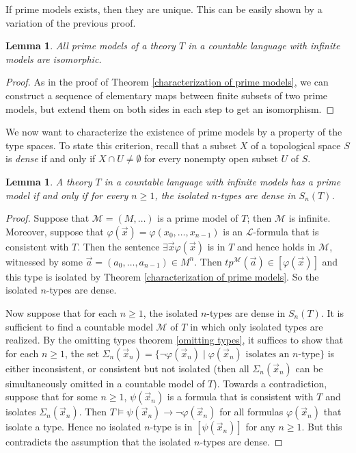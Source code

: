 \documentclass[10pt]{amsart}
\renewcommand{\L}{\mathcal{L}}
\newcommand{\MM}{\mathcal{M}}
\newtheorem{lemma}[theorem]{Lemma}
\theoremstyle{definition}
\theoremstyle{remark}
\begin{document}
If prime models exists, then they are unique. This can be easily shown by a variation of the previous proof.  

\begin{lemma} 
All prime models of a theory $T$ in a countable language with infinite models are isomorphic. 
\end{lemma} 
\begin{proof} 
As in the proof of Theorem \ref{characterization of prime models}, we can construct a sequence of elementary maps between finite subsets of two prime models, but extend them on both sides in each step to get an isomorphism. 
\end{proof} 

We now want to characterize the existence of prime models by a property of the type spaces. To state this criterion, recall that a subset $X$ of a topological space $S$ is \emph{dense} if and only if $X\cap U\neq \emptyset$ for every nonempty open subset $U$ of $S$. 

\begin{lemma} \label{characterization of theories with prime models}
A theory $T$ in a countable language with infinite models has a prime model if and only if for every $n\geq1$, the isolated $n$-types are dense in $S_n(T)$. 
\end{lemma} 
\begin{proof} 
Suppose that $\MM=(M,\dots)$ is a prime model of $T$; then $\MM$ is infinite. Moreover, suppose that $\varphi(\vec{x})=\varphi(x_0,\dots,x_{n-1})$ is an $\L$-formula that is consistent with $T$. Then the sentence $\exists \vec{x}\varphi(\vec{x})$ is in $T$ and hence holds in $\MM$, witnessed by some $\vec{a}=(a_0,\dots,a_{n-1})\in M^n$. Then $tp^\MM(\vec{a})\in [\varphi(\vec{x})]$ and this type is isolated by Theorem \ref{characterization of prime models}. So the isolated $n$-types are dense. 

Now suppose that for each $n\geq1$, the isolated $n$-types are dense in $S_n(T)$. It is sufficient to find a countable model $\MM$ of $T$ in which only isolated types are realized. By the omitting types theorem \ref{omitting types}, it suffices to show that for each $n\geq1$, the set $\Sigma_n(\vec{x}_n)=\{\neg \varphi(\vec{x}_n)\mid \varphi(\vec{x}_n)\text{ isolates an $n$-type}\}$ is either inconsistent, or consistent but not isolated (then all $\Sigma_n(\vec{x}_n)$ can be simultaneously omitted in a countable model of $T$). Towards a contradiction, suppose that for some $n\geq1$, $\psi(\vec{x}_n)$ is a formula that is consistent with $T$ and isolates $\Sigma_n(\vec{x}_n)$. Then $T\models \psi(\vec{x}_n)\rightarrow \neg\varphi(\vec{x}_n)$ for all formulas $\varphi(\vec{x}_n)$ that isolate a type. Hence no isolated $n$-type is in $[\psi(\vec{x}_n)]$ for any $n\geq1$. But this contradicts the assumption that the isolated $n$-types are dense. 
\end{proof} 
\end{document}

